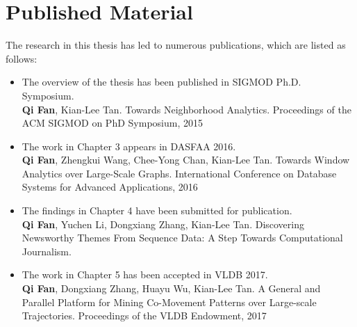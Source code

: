 \section{Published Material}
The research in this thesis has led to numerous publications, which are listed as follows: 

\begin{itemize}
	\item{The overview of the thesis has been published in SIGMOD Ph.D. Symposium.\\
		\textbf{Qi Fan}, Kian-Lee Tan. Towards Neighborhood Analytics. Proceedings of the ACM SIGMOD on PhD Symposium, 2015
	}
	\item{The work in Chapter 3 appears in DASFAA 2016.\\
		\textbf{Qi Fan}, Zhengkui Wang, Chee-Yong Chan, Kian-Lee Tan. Towards Window Analytics over Large-Scale Graphs. International Conference on Database Systems for Advanced Applications, 2016
	}
	\item{The findings in Chapter 4 have been submitted for publication.\\
		\textbf{Qi Fan}, Yuchen Li, Dongxiang Zhang, Kian-Lee Tan. Discovering Newsworthy Themes From Sequence Data: A Step Towards Computational Journalism.
	}
	\item{The work in Chapter 5 has been accepted in VLDB 2017.\\
		\textbf{Qi Fan}, Dongxiang Zhang, Huayu Wu, Kian-Lee Tan. A General and Parallel Platform for Mining Co-Movement Patterns over Large-scale Trajectories. Proceedings of the VLDB Endowment, 2017
	}	
\end{itemize}

%
%
%
%
%
%
